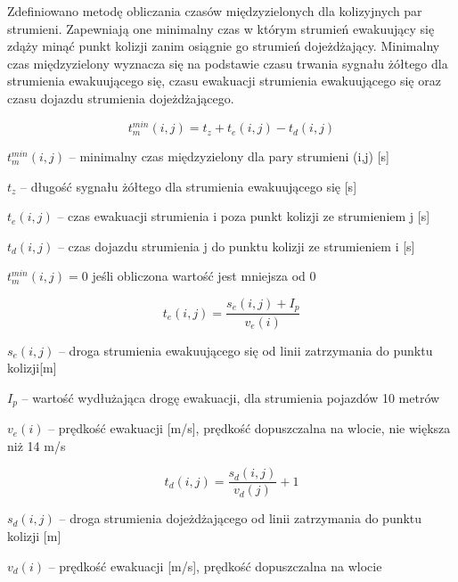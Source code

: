 Zdefiniowano metodę obliczania czasów międzyzielonych dla kolizyjnych par strumieni. Zapewniają one minimalny czas w którym strumień ewakuujący się zdąży minąć punkt kolizji zanim osiągnie go strumień dojeżdżający. Minimalny czas międzyzielony wyznacza się na podstawie czasu trwania sygnału żółtego dla strumienia ewakuującego się, czasu ewakuacji strumienia ewakuującego się oraz czasu dojazdu strumienia dojeżdżającego.

\begin{equation}
	t^{min}_{m} (i,j) = t_{z} + t_{e} (i,j) - t_{d} (i,j)
\end{equation}

\begin{math} t^{min}_{m} (i,j) \end{math} \textrm{ -- minimalny czas międzyzielony dla pary strumieni (i,j) [s]}

\begin{math} t_{z} \end{math} \textrm{ -- długość sygnału żółtego dla strumienia ewakuującego się [s]}

\begin{math} t_{e} (i,j) \end{math} \textrm{ -- czas ewakuacji strumienia i poza punkt kolizji ze strumieniem j [s]}

\begin{math} t_{d} (i,j) \end{math} \textrm{ -- czas dojazdu strumienia j do punktu kolizji ze strumieniem i [s]}

\begin{math} t^{min}_{m} (i,j) = 0 \end{math} \textrm{ jeśli obliczona wartość jest mniejsza od 0}

\begin{equation}
	t_{e} (i,j) = \frac{s_{e} (i,j) + I_p}{v_{e} (i)}
\end{equation}

\begin{math} s_{e} (i,j) \end{math} \textrm{ -- droga strumienia ewakuującego się od linii zatrzymania do punktu kolizji[m]}

\begin{math} I_p \end{math} \textrm{ -- wartość wydłużająca drogę ewakuacji, dla strumienia pojazdów 10 metrów}

\begin{math} v_{e} (i) \end{math} \textrm{ -- prędkość ewakuacji [m/s], prędkość dopuszczalna na wlocie, nie większa niż 14 m/s}

\begin{equation}
	t_{d} (i,j) = \frac{s_{d} (i,j)}{v_{d} (j)} + 1
\end{equation}

\begin{math} s_{d} (i,j) \end{math} \textrm{ -- droga strumienia dojeżdżającego od linii zatrzymania do punktu kolizji [m]}

\begin{math} v_{d} (i) \end{math} \textrm{ -- prędkość ewakuacji [m/s], prędkość dopuszczalna na wlocie}